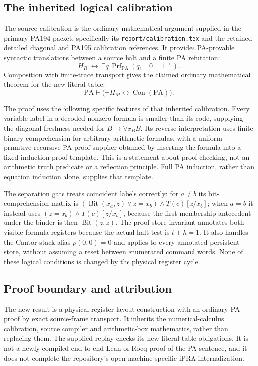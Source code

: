 \subsection{The inherited logical calibration}

The source calibration is the ordinary mathematical argument supplied in
the primary PA194 packet, specifically its
\texttt{report/calibration.tex} and the retained detailed diagonal and
PA195 calibration references.  It provides PA-provable syntactic
translations between a source halt and a finite PA refutation:
\[
 H_R\ \leftrightarrow\
 \exists q\,\operatorname{Prf}_{\mathrm{PA}}(q,\ulcorner0=1\urcorner).
\]
Composition with finite-trace transport gives the claimed ordinary
mathematical theorem for the new literal table:
\[
 \boxed{\mathrm{PA}\vdash
   \bigl(\neg H_M\leftrightarrow\operatorname{Con}(\mathrm{PA})\bigr).}
\]

The proof uses the following specific features of that inherited
calibration.  Every variable label in a decoded nonzero formula is smaller
than its code, supplying the diagonal freshness needed for
$B\to\forall x_B B$.  Its reverse interpretation uses finite binary
comprehension for arbitrary arithmetic formulas, with a uniform
primitive-recursive PA proof supplier obtained by inserting the formula
into a fixed induction-proof template.  This is a statement about proof
checking, not an arithmetic truth predicate or a reflection principle.
Full PA induction, rather than equation induction alone, supplies that
template.

The separation gate treats coincident labels correctly: for $a\ne b$
its bit-comprehension matrix is
$(\operatorname{Bit}(x_a,z)\lor z=x_b)\wedge T(c)[z/x_b]$; when $a=b$
it instead uses $(z=x_b)\wedge T(c)[z/x_b]$, because the first membership
antecedent under the binder is then $\operatorname{Bit}(z,z)$.
The proof-store invariant annotates both visible formula registers
because the actual halt test is $t+h=1$.  It also handles the Cantor-stack
alias $p(0,0)=0$ and applies to every annotated persistent store, without
assuming a reset between enumerated command words.  None of these
logical conditions is changed by the physical register cycle.

\subsection{Proof boundary and attribution}

The new result is a physical register-layout construction with an
ordinary PA proof by exact source-frame transport.  It inherits the
numerical-calculus calibration, source compiler and arithmetic-box
mathematics, rather than replacing them.  The supplied replay checks its
new literal-table obligations.  It is not a newly compiled end-to-end
Lean or Rocq proof of the PA sentence, and it does not complete the
repository's open machine-specific iPRA internalization.

